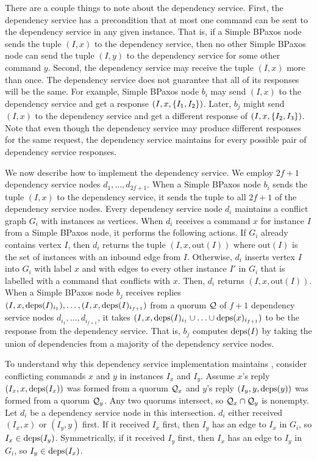 There are a couple things to note about the dependency service.
%
First, the dependency service has a precondition that at most one command can
be sent to the dependency service in any given instance. That is, if a Simple
BPaxos node sends the tuple $(I, x)$ to the dependency service, then no other
Simple BPaxos node can send the tuple $(I, y)$ to the dependency service for
some other command $y$.
%
Second, the dependency service may receive the tuple $(I, x)$ more than once.
The dependency service does not guarantee that all of its responses will be the
same. For example, Simple BPaxos node $b_i$ may send $(I, x)$ to the dependency
service and get a response $(I, x, \{I_1, I_2\})$. Later, $b_j$ might send
$(I, x)$ to the dependency service and get a different response of $(I, x,
\{I_2, I_3\})$. Note that even though the dependency service may produce
different responses for the same request, the dependency service maintains
 for every possible pair of dependency service
responses.

\newcommand{\out}[1]{\text{out}(#1)}
We now describe how to implement the dependency service. We employ $2f + 1$
dependency service nodes $d_{1}, \ldots, d_{2f + 1}$. When a Simple BPaxos node
$b_i$ sends the tuple $(I, x)$ to the dependency service, it sends the tuple to
all $2f + 1$ of the dependency service nodes. Every dependency service node
$d_i$ maintains a conflict graph $G_i$ with instances as vertices. When $d_i$
receives a command $x$ for instance $I$ from a Simple BPaxos node, it performs
the following actions.
%
If $G_i$ already contains vertex $I$, then $d_i$ returns the tuple $(I, x,
\out{I})$ where $\out{I}$ is the set of instances with an inbound edge from
$I$.
%
Otherwise, $d_i$ inserts vertex $I$ into $G_i$ with label $x$ and with edges to
every other instance $I'$ in $G_i$ that is labelled with a command that
conflicts with $x$. Then, $d_i$ returns $(I, x, \out{I})$.
%
When a Simple BPaxos node $b_j$ receives replies $(I, x, \text{deps}(I)_{i_1}),
\ldots, (I, x, \text{deps}(I)_{i_{f+1}})$ from a quorum $\mathcal{Q}$ of $f + 1$
dependency service nodes $d_{i_1}, \ldots, d_{i_{f+1}}$, it takes $(I, x,
\text{deps}(I)_{i_1} \cup \ldots \cup \text{deps}(x)_{i_{f+1}})$ to be the response from
the dependency service. That is, $b_j$ computes $\text{deps}(I)$ by taking the union
of dependencies from a majority of the dependency service nodes.

To understand why this dependency service implementation maintains
, consider conflicting commands $x$ and $y$ in
instances $I_x$ and $I_y$. Assume $x$'s reply $(I_x, x, \text{deps}(I_x))$ was formed
from a quorum $\mathcal{Q}_x$ and $y$'s reply $(I_y, y, \text{deps}(y))$ was formed from
a quorum $\mathcal{Q}_y$. Any two quorums intersect, so $\mathcal{Q}_x \cap \mathcal{Q}_y$
is nonempty. Let $d_i$ be a dependency service node in this intersection. $d_i$
either received $(I_x, x)$ or $(I_y, y)$ first. If it received $I_x$ first,
then $I_y$ has an edge to $I_x$ in $G_i$, so $I_x \in \text{deps}(I_y)$.
Symmetrically, if it received $I_y$ first, then $I_x$ has an edge to $I_y$ in
$G_i$, so $I_y \in \text{deps}(I_x)$.

